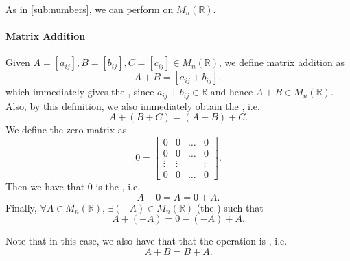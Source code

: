 As in \cref{sub:numbers}, we can perform  on $M_n(\mathbb{R})$.

\paragraph{Matrix Addition} Given $A = [a_{ij}], B = [b_{ij}], C = [c_{ij}] \in M_n(\mathbb{R})$, we define matrix addition as
\begin{equation*}
  A + B = [a_{ij} + b_{ij}],
\end{equation*}
which immediately gives the , since $a_{ij} + b_{ij} \in \mathbb{R}$ and hence $A + B \in M_n(\mathbb{R})$. Also, by this definition, we also immediately obtain the , i.e.
\begin{equation*}
  A + (B + C) = (A + B) + C.
\end{equation*}
We define the zero matrix as
\begin{equation*}
  0 = \begin{bmatrix}
    0      &   0    & \hdots &   0 \\
    0      &   0    & \hdots &   0 \\
    \vdots & \vdots &        & \vdots \\
    0      &   0    & \hdots &   0
  \end{bmatrix}.
\end{equation*}
Then we have that $0$ is the , i.e.
\begin{equation*}
  A + 0 = A = 0 + A.
\end{equation*}
Finally, $\forall A \in M_n(\mathbb{R})$, $\exists (-A) \in M_n(\mathbb{R})$ (the ) such that
\begin{equation*}
  A + (-A) = 0 - (-A) + A.
\end{equation*}

Note that in this case, we also have that that the operation is , i.e.
\begin{equation*}
  A + B = B + A.
\end{equation*}

